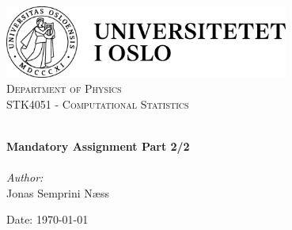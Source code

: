 
\begin{titlepage}
\vbox{ }
\vbox{ }
\begin{center}
\includegraphics[width=0.70\textwidth]{Images/01_uio_full_logo_no_pos}\\[1cm]
\textsc{\LARGE Department of Physics}\\[1.5cm]
\textsc{\Large STK4051 - Computational Statistics}\\[0.5cm]
\vbox{ }

\HRule \\[0.4cm]
{ \huge \bfseries Mandatory Assignment Part 2/2}\\[0.4cm]
\HRule \\[1.5cm]

\large
\emph{Author:}\\
Jonas Semprini Næss
\vfill

{\large Date: \today}
\end{center}
\end{titlepage}